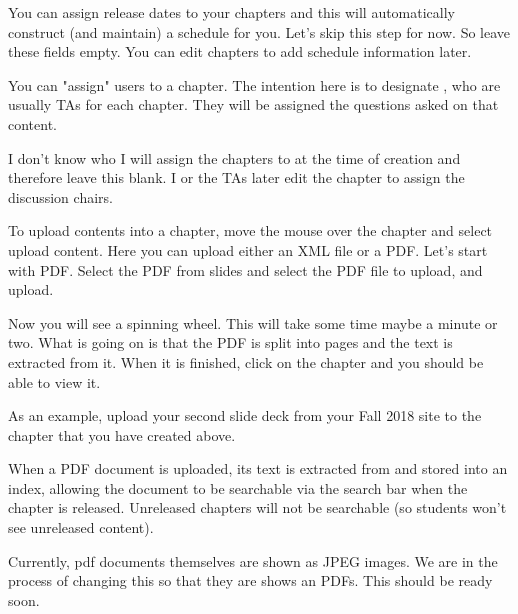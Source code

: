 \begin{gram}  
You can assign release dates to your chapters and this will
automatically construct (and maintain) a schedule for you.  Let's skip
this step for now.  So leave these fields empty.  You can edit
chapters to add schedule information later.
\end{gram}


\begin{gram}
You can "assign" users to a chapter.  The intention here is to
designate , who are usually TAs for each
chapter. 
%
They will be assigned the questions asked on that content.

I don't know who I will assign the chapters to at the time of creation and therefore leave this blank.  I or the TAs later edit the chapter to assign the discussion chairs. 
\end{gram}

\begin{gram}
\label{guide:chapter::upload}
To upload contents into a chapter, move the mouse over the chapter and
select upload content.  Here you can upload either an XML
file or a PDF.  Let's start with PDF.  Select the PDF from
slides and select the PDF file to upload, and upload.  

Now you will see a spinning wheel.  This will take some time maybe a
minute or two.  What is going on is that the PDF is split into pages
and the text is extracted from it.  When it is finished, click on the
chapter and you should be able to view it.  

As an example, upload your second slide deck from your Fall 2018 site to the chapter that you have created above.
\end{gram}

\begin{important} 
When a PDF document is uploaded, its text is extracted from and stored into an index, allowing the document to be searchable via the search bar when the chapter is released.
%
Unreleased chapters will not be searchable (so students won't see
unreleased content).
\end{important}

\begin{note}
Currently, pdf documents themselves are shown as JPEG images.  We are in the process of changing this so that they are shows an PDFs.  This should be ready soon.
\end{note}


